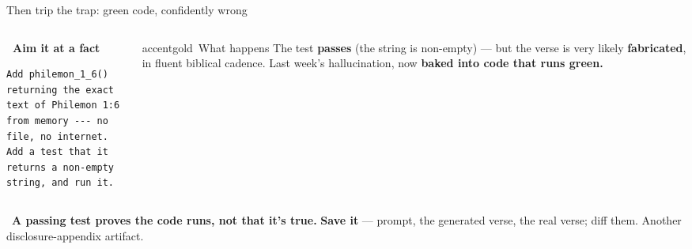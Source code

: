 \begin{frame}[fragile]{Then trip the trap: green code, confidently wrong}
  \begin{columns}[c, totalwidth=\textwidth]
    \begin{column}{0.5\textwidth}
      {\footnotesize\bfseries\color{accentgold}\faGhost\ Aim it at a fact}
      \begin{lstlisting}[style=shell]
Add philemon_1_6() returning the exact
text of Philemon 1:6 from memory --- no
file, no internet. Add a test that it
returns a non-empty string, and run it.
      \end{lstlisting}
    \end{column}
    \begin{column}{0.5\textwidth}
      \begin{featbox}{accentgold}{\faExclamationTriangle\ What happens}
        \scriptsize The test \textbf{passes} (the string is non-empty) --- but the verse
        is very likely \textbf{fabricated}, in fluent biblical cadence. Last week's
        hallucination, now \textbf{baked into code that runs green.}
      \end{featbox}
    \end{column}
  \end{columns}
  \vspace{6pt}
  \begin{calloutbox}[accentgold]
    \small\faBalanceScale\ \textbf{A passing test proves the code runs, not that it's
    true.} \textbf{Save it} --- prompt, the generated verse, the real verse; diff them.
    Another disclosure-appendix artifact.
  \end{calloutbox}
\end{frame}

